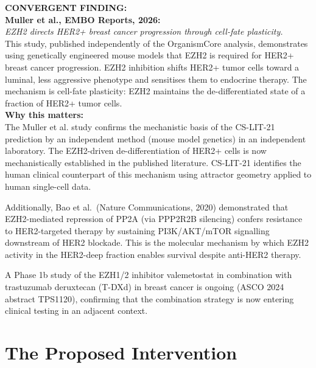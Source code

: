 \documentclass[12pt, a4paper]{article}
\begin{document}
\begin{center}
\colorbox{convergentbox}{
\begin{minipage}{0.88\textwidth}
\vspace{0.5em}
\textbf{CONVERGENT FINDING:}\\[0.4em]
\textbf{Muller et al., EMBO Reports, 2026:}\\
\textit{EZH2 directs HER2+ breast cancer
progression through cell-fate plasticity.}\\[0.4em]
This study, published independently of the
OrganismCore analysis, demonstrates using
genetically engineered mouse models that
EZH2 is required for HER2+ breast cancer
progression. EZH2 inhibition shifts HER2+
tumor cells toward a luminal, less aggressive
phenotype and sensitises them to endocrine
therapy. The mechanism is cell-fate
plasticity: EZH2 maintains the de-differentiated
state of a fraction of HER2+ tumor cells.\\[0.4em]
\textbf{Why this matters:}\\
The Muller et al. study confirms the
mechanistic basis of the CS-LIT-21 prediction
by an independent method (mouse model
genetics) in an independent laboratory.
The EZH2-driven de-differentiation of
HER2+ cells is now mechanistically established
in the published literature. CS-LIT-21
identifies the human clinical counterpart
of this mechanism using attractor geometry
applied to human single-cell data.
\vspace{0.5em}
\end{minipage}}
\end{center}

\vspace{0.5em}

Additionally, Bao et al.\ (Nature Communications,
2020) demonstrated that EZH2-mediated repression
of PP2A (via PPP2R2B silencing) confers
resistance to HER2-targeted therapy by
sustaining PI3K/AKT/mTOR signalling downstream
of HER2 blockade. This is the molecular
mechanism by which EZH2 activity in the
HER2-deep fraction enables survival despite
anti-HER2 therapy.

A Phase 1b study of the EZH1/2 inhibitor
valemetostat in combination with trastuzumab
deruxtecan (T-DXd) in breast cancer is
ongoing (ASCO 2024 abstract TPS1120),
confirming that the combination strategy
is now entering clinical testing in an
adjacent context.

\section{The Proposed Intervention}
\end{document}

